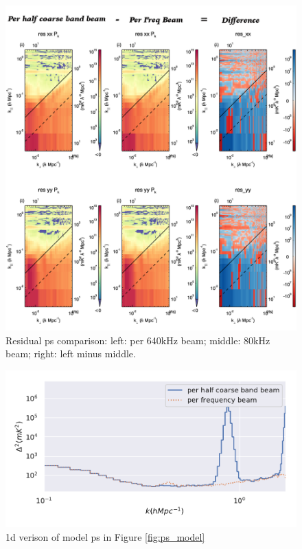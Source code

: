\documentclass[10pt]{extarticle}
\begin{document}
\begin{figure}
    \centering
    \includegraphics[width=\linewidth]{RESIDUAL.png}
    \caption{Residual ps comparison: left: per 640kHz beam; middle: 80kHz beam; right: left minus middle.}
    \label{fig:ps_res}
\end{figure}

\begin{figure}
    \centering
    \includegraphics[width=\linewidth]{beam_ps_model.pdf}
    \caption{1d verison of model ps in Figure \ref{fig:ps_model}}
    \label{fig:model_1d}
\end{figure}
\end{document}
